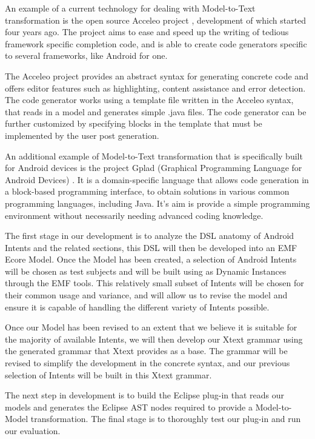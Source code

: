 An example of a current technology for dealing with Model-to-Text transformation is the open source Acceleo project \cite{acceleo}, development of which started four years ago. The project aims to ease and speed up the writing of tedious framework specific completion code, and is able to create code generators specific to several frameworks, like Android for one.

The Acceleo project provides an abstract syntax for generating concrete code and offers editor features such as highlighting, content assistance and error detection. The code generator works using a template file written in the Acceleo syntax, that reads in a model and generates simple .java files. The code generator can be further customized by specifying blocks in the template that must be implemented by the user post generation.

An additional example of Model-to-Text transformation that is specifically built for Android devices is the project Gplad (Graphical Programming Language for Android Devices) \cite{gplad}. It is a domain-specific language that allows code generation in a block-based programming interface, to obtain solutions in various common programming languages, including Java. It's aim is provide a simple programming environment without necessarily needing advanced coding knowledge.

The first stage in our development is to analyze the DSL anatomy of Android Intents and the related sections, this DSL will then be developed into an EMF Ecore Model. Once the Model has been created, a selection of Android Intents will be chosen as test subjects and will be built using as Dynamic Instances through the EMF tools. This relatively small subset of Intents will be chosen for their common usage and variance, and will allow us to revise the model and ensure it is capable of handling the different variety of Intents possible.

Once our Model has been revised to an extent that we believe it is suitable for the majority of available Intents, we will then develop our Xtext grammar using the generated grammar that Xtext provides as a base. The grammar will be revised to simplify the development in the concrete syntax, and our previous selection of Intents will be built in this Xtext grammar.

The next step in development is to build the Eclipse plug-in that reads our models and generates the Eclipse AST nodes required to provide a Model-to-Model transformation. The final stage is to thoroughly test our plug-in and run our evaluation.

